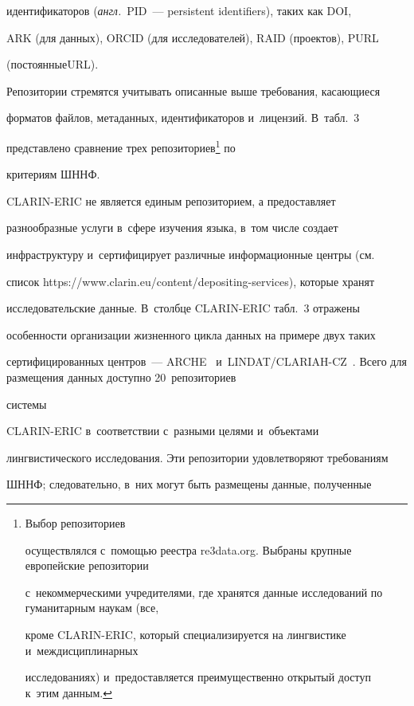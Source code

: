 идентификаторов (\textit{англ.}\ PID~--- persistent identifiers), таких как DOI, 

ARK (для данных), ORCID (для исследователей), RAID (проектов), PURL 

(постоянные\linebreak URL).

  

  Репозитории стремятся учитывать описанные выше требования, касающиеся 

форматов файлов, метаданных, идентификаторов и~лицензий. В~табл.~3 

представлено сравнение трех репозиториев\footnote{Выбор репозиториев 

осуществлялся с~помощью реестра re3data.org. Выбраны крупные европейские репозитории 

с~некоммерческими учредителями, где хранятся данные исследований по гуманитарным наукам (все, 

кроме CLARIN-ERIC, который специализируется на лингвистике и~междисциплинарных 

исследованиях) и~предоставляется преимущественно открытый доступ к~этим данным.} по 

критериям ШННФ.

  

 



  

  CLARIN-ERIC не является единым репозиторием, а предоставляет 

разнообразные услуги в~сфере изучения языка, в~том числе создает 

инфраструктуру и~сертифицирует различные информационные центры (см.\ 

список {\sf https://www.clarin.eu/content/depositing-services}), которые хранят 

исследовательские данные. В~столб\-це CLARIN-ERIC табл.~3 отражены 

особенности организации жизненного цикла данных на примере двух таких 

сертифицированных центров~--- ARCHE~\cite{46-nur} и~LINDAT/CLARIAH-CZ~\cite{47-nur}. Всего для размещения данных доступно 20~репозиториев 

системы  

CLARIN-ERIC в~соответствии с~разными целями и~объектами 

лингвистического исследования. Эти репозитории удовлетворяют требованиям 

ШННФ; следовательно, в~них могут быть размещены данные, полученные 

